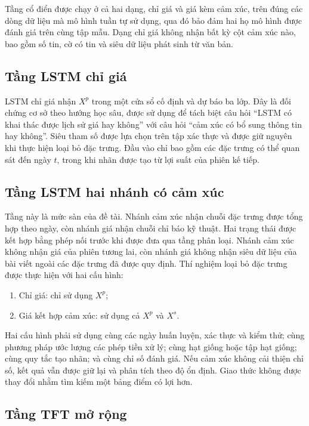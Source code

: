 \documentclass[12pt, a4paper, oneside]{report}
\begin{document}
Tầng cổ điển được chạy ở cả hai dạng, chỉ giá và giá kèm cảm xúc, trên đúng các dòng
dữ liệu mà mô hình tuần tự sử dụng, qua đó bảo đảm hai họ mô hình được đánh giá trên
cùng tập mẫu. Dạng chỉ giá không nhận bất kỳ cột cảm xúc nào, bao gồm số tin, cờ có
tin và siêu dữ liệu phát sinh từ văn bản.

\subsection{Tầng LSTM chỉ giá}

LSTM chỉ giá nhận $X^p$ trong một cửa sổ cố định và dự báo ba lớp. Đây là đối chứng
cơ sở theo hướng học sâu, được sử dụng để tách biệt câu hỏi ``LSTM có khai thác được
lịch sử giá hay không'' với câu hỏi ``cảm xúc có bổ sung thông tin hay không''. Siêu
tham số được lựa chọn trên tập xác thực và được giữ nguyên khi thực hiện loại bỏ đặc
trưng. Đầu vào chỉ bao gồm các đặc trưng có thể quan sát đến ngày $t$, trong khi nhãn
được tạo từ lợi suất của phiên kế tiếp.

\subsection{Tầng LSTM hai nhánh có cảm xúc}

Tầng này là mức sàn của đề tài. Nhánh cảm xúc nhận chuỗi đặc trưng được tổng hợp theo
ngày, còn nhánh giá nhận chuỗi chỉ báo kỹ thuật. Hai trạng thái được kết hợp bằng
phép nối trước khi được đưa qua tầng phân loại. Nhánh cảm xúc không nhận giá của
phiên tương lai, còn nhánh giá không nhận siêu dữ liệu của bài viết ngoài các đặc
trưng đã được quy định. Thí nghiệm loại bỏ đặc trưng được thực hiện với hai cấu hình:

\begin{enumerate}[nosep]
  \item Chỉ giá: chỉ sử dụng $X^p$;
  \item Giá kết hợp cảm xúc: sử dụng cả $X^p$ và $X^s$.
\end{enumerate}

Hai cấu hình phải sử dụng cùng các ngày huấn luyện, xác thực và kiểm thử; cùng phương
pháp ước lượng các phép tiền xử lý; cùng hạt giống hoặc tập hạt giống; cùng quy tắc
tạo nhãn; và cùng chỉ số đánh giá. Nếu cảm xúc không cải thiện chỉ số, kết quả vẫn
được giữ lại và phân tích theo độ ổn định. Giao thức không được thay đổi nhằm tìm
kiếm một bảng điểm có lợi hơn.

\subsection{Tầng TFT mở rộng}
\end{document}
